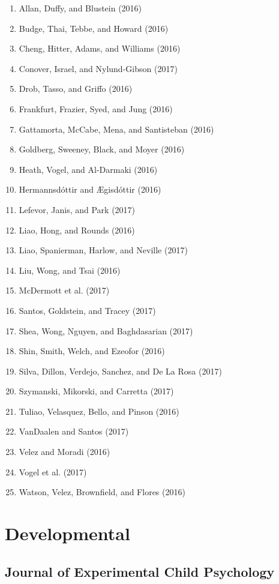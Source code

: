 \documentclass[english,man]{apa6}
\providecommand{\tightlist}{%
  \setlength{\itemsep}{0pt}\setlength{\parskip}{0pt}}
\theoremstyle{definition}
\theoremstyle{definition}
\theoremstyle{definition}
\theoremstyle{remark}
\begin{document}
\begin{enumerate}
\def\labelenumi{\arabic{enumi})}
\tightlist
\item
  Allan, Duffy, and Blustein (2016)
\item
  Budge, Thai, Tebbe, and Howard (2016)
\item
  Cheng, Hitter, Adams, and Williams (2016)
\item
  Conover, Israel, and Nylund-Gibson (2017)
\item
  Drob, Tasso, and Griffo (2016)
\item
  Frankfurt, Frazier, Syed, and Jung (2016)
\item
  Gattamorta, McCabe, Mena, and Santisteban (2016)
\item
  Goldberg, Sweeney, Black, and Moyer (2016)
\item
  Heath, Vogel, and Al-Darmaki (2016)
\item
  Hermannsdóttir and Ægisdóttir (2016)
\item
  Lefevor, Janis, and Park (2017)
\item
  Liao, Hong, and Rounds (2016)
\item
  Liao, Spanierman, Harlow, and Neville (2017)
\item
  Liu, Wong, and Tsai (2016)
\item
  McDermott et al. (2017)
\item
  Santos, Goldstein, and Tracey (2017)
\item
  Shea, Wong, Nguyen, and Baghdasarian (2017)
\item
  Shin, Smith, Welch, and Ezeofor (2016)
\item
  Silva, Dillon, Verdejo, Sanchez, and De La Rosa (2017)
\item
  Szymanski, Mikorski, and Carretta (2017)
\item
  Tuliao, Velasquez, Bello, and Pinson (2016)
\item
  VanDaalen and Santos (2017)
\item
  Velez and Moradi (2016)
\item
  Vogel et al. (2017)
\item
  Watson, Velez, Brownfield, and Flores (2016)
\end{enumerate}

\section{Developmental}\label{developmental}

\subsection{Journal of Experimental Child
Psychology}\label{journal-of-experimental-child-psychology}
\end{document}
